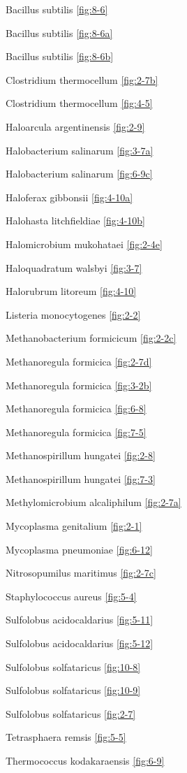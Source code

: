 \documentclass[]{tufte-book}
\begin{document}
Bacillus subtilis \ref{fig:8-6}

Bacillus subtilis \ref{fig:8-6a}

Bacillus subtilis \ref{fig:8-6b}

Clostridium thermocellum \ref{fig:2-7b}

Clostridium thermocellum \ref{fig:4-5}

Haloarcula argentinensis \ref{fig:2-9}

Halobacterium salinarum \ref{fig:3-7a}

Halobacterium salinarum \ref{fig:6-9c}

Haloferax gibbonsii \ref{fig:4-10a}

Halohasta litchfieldiae \ref{fig:4-10b}

Halomicrobium mukohataei \ref{fig:2-4e}

Haloquadratum walsbyi \ref{fig:3-7}

Halorubrum litoreum \ref{fig:4-10}

Listeria monocytogenes \ref{fig:2-2}

Methanobacterium formicicum \ref{fig:2-2c}

Methanoregula formicica \ref{fig:2-7d}

Methanoregula formicica \ref{fig:3-2b}

Methanoregula formicica \ref{fig:6-8}

Methanoregula formicica \ref{fig:7-5}

Methanospirillum hungatei \ref{fig:2-8}

Methanospirillum hungatei \ref{fig:7-3}

Methylomicrobium alcaliphilum \ref{fig:2-7a}

Mycoplasma genitalium \ref{fig:2-1}

Mycoplasma pneumoniae \ref{fig:6-12}

Nitrosopumilus maritimus \ref{fig:2-7c}

Staphylococcus aureus \ref{fig:5-4}

Sulfolobus acidocaldarius \ref{fig:5-11}

Sulfolobus acidocaldarius \ref{fig:5-12}

Sulfolobus solfataricus \ref{fig:10-8}

Sulfolobus solfataricus \ref{fig:10-9}

Sulfolobus solfataricus \ref{fig:2-7}

Tetrasphaera remsis \ref{fig:5-5}

Thermococcus kodakaraensis \ref{fig:6-9}
\end{document}
